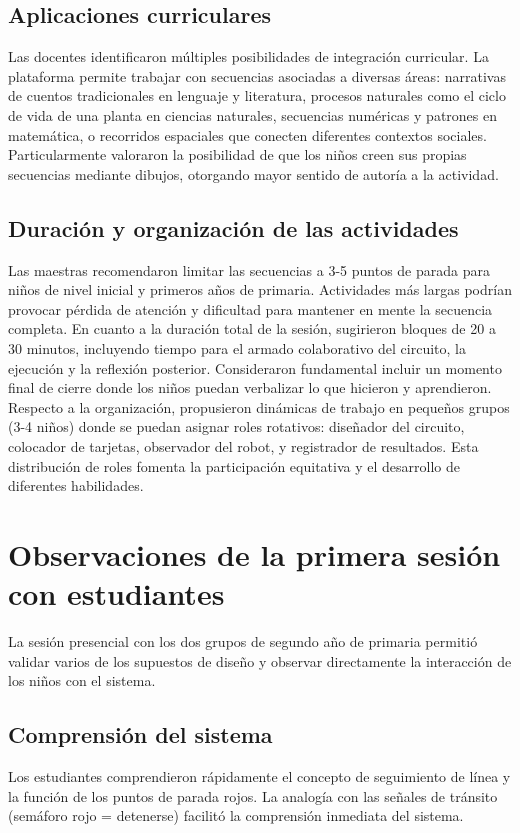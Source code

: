 \documentclass{prgrado}
\begin{document}
\subsection{Aplicaciones curriculares}
Las docentes identificaron múltiples posibilidades de integración curricular. La plataforma permite trabajar con secuencias asociadas a diversas áreas: narrativas de cuentos tradicionales en lenguaje y literatura, procesos naturales como el ciclo de vida de una planta en ciencias naturales, secuencias numéricas y patrones en matemática, o recorridos espaciales que conecten diferentes contextos sociales. Particularmente valoraron la posibilidad de que los niños creen sus propias secuencias mediante dibujos, otorgando mayor sentido de autoría a la actividad.

\subsection{Duración y organización de las actividades}
Las maestras recomendaron limitar las secuencias a 3-5 puntos de parada para niños de nivel inicial y primeros años de primaria. Actividades más largas podrían provocar pérdida de atención y dificultad para mantener en mente la secuencia completa.
En cuanto a la duración total de la sesión, sugirieron bloques de 20 a 30 minutos, incluyendo tiempo para el armado colaborativo del circuito, la ejecución y la reflexión posterior. Consideraron fundamental incluir un momento final de cierre donde los niños puedan verbalizar lo que hicieron y aprendieron.
Respecto a la organización, propusieron dinámicas de trabajo en pequeños grupos (3-4 niños) donde se puedan asignar roles rotativos: diseñador del circuito, colocador de tarjetas, observador del robot, y registrador de resultados. Esta distribución de roles fomenta la participación equitativa y el desarrollo de diferentes habilidades.
\section{Observaciones de la primera sesión con estudiantes}
La sesión presencial con los dos grupos de segundo año de primaria permitió validar varios de los supuestos de diseño y observar directamente la interacción de los niños con el sistema.
\subsection{Comprensión del sistema}
Los estudiantes comprendieron rápidamente el concepto de seguimiento de línea y la función de los puntos de parada rojos. La analogía con las señales de tránsito (semáforo rojo = detenerse) facilitó la comprensión inmediata del sistema.
\end{document}
